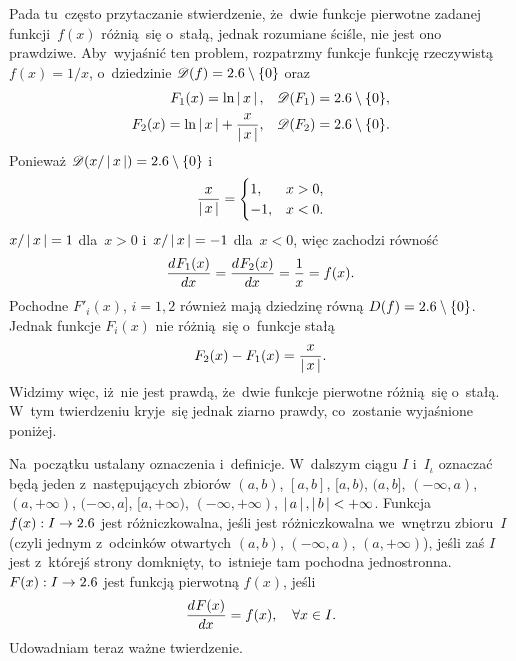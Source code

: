 \documentclass[a4paper,11pt]{article}
\begin{document}
\start {} Pada tu~często przytaczanie stwierdzenie, że~dwie
funkcje pierwotne zadanej funkcji~$f( x )$ różnią~się o~stałą, jednak
rozumiane ściśle, nie jest ono prawdziwe. Aby~wyjaśnić ten problem,
rozpatrzmy funkcje funkcję rzeczywistą $f( x ) = 1 / x$, o~dziedzinie
$\mathcal{D}( f ) = 2.6 \setminus \{  0  \}$ oraz
\begin{subequations}
  \begin{align}
    \label{eq:FichtenholzVolII-01a}
    F_{ 1 }( x )
    = \ln\left| \,  x  \, \right|, \quad &\mathcal{D}( F_{ 1 } ) = 2.6 \setminus \{  0  \}, \\
    \label{eq:FichtenholzVolII-01b}
    F_{ 2 }( x )
    = \ln\left| \,  x  \, \right| + \frac{ x }{ \left| \,  x  \, \right| },
    \quad &\mathcal{D}( F_{ 2 } ) = 2.6 \setminus \{  0  \}.
  \end{align}
\end{subequations}
Ponieważ $\mathcal{D}( x / \left| \,  x  \, \right| ) = 2.6 \setminus \{  0  \}$ i
\begin{equation}
  \label{eq:FichtenholzVolII-02}
  \frac{ x }{ \left| \,  x  \, \right| }
  =
  \begin{cases}
    1, &x > 0, \\
    -1, &x < 0.
  \end{cases}
\end{equation}
$x / \left| \,  x  \, \right| = 1$ dla~$x > 0$ i~$x / \left| \,  x  \, \right| = -1$ dla~$x < 0$,
więc zachodzi równość
\begin{equation}
  \label{eq:FichtenholzVolII-03}
  \frac{ d^{   } {  F_{ 1 }( x )  } }{ d {  x  }^{   } } = \frac{ d^{   } {  F_{ 2 }( x )  } }{ d {  x  }^{   } }
  = \frac{ 1 }{ x } = f( x ).
\end{equation}
Pochodne $F'_{ i }( x )$, $i = 1, 2$ również mają dziedzinę równą
$D( f ) = 2.6 \setminus \{  0  \}$. Jednak funkcje $F_{ i }( x )$ nie
różnią~się o~funkcje stałą
\begin{equation}
  \label{eq:FichtenholzVolII-04}
  F_{ 2 }( x ) - F_{ 1 }( x ) = \frac{ x }{ \left| \,  x  \, \right| }.
\end{equation}
Widzimy więc, iż~nie jest prawdą, że~dwie funkcje pierwotne różnią~się
o~stałą. W~tym twierdzeniu kryje~się jednak ziarno prawdy, co~zostanie
wyjaśnione poniżej.

Na~początku ustalany oznaczenia i~definicje. W~dalszym ciągu $I$
i~$I_{ \iota }$ oznaczać będą jeden z~następujących zbiorów
$( a, b )$, $[ a, b ]$, $[ a, b )$, $( a, b ]$, $( -\infty, a )$,
$( a, +\infty )$, $( -\infty, a ]$, $[ a, +\infty )$,
$( -\infty, +\infty )$, $\left| \,  a  \, \right|, \left| \,  b  \, \right| < +\infty$. Funkcja
$f( x ): I \to 2.6$ jest różniczkowalna, jeśli jest różniczkowalna
we~wnętrzu zbioru~$I$ (czyli jednym z~odcinków otwartych $( a, b )$,
$( -\infty, a )$, $( a, +\infty )$), jeśli zaś $I$ jest z~którejś
strony domknięty, to~istnieje tam pochodna jednostronna.
$F( x ): I \to 2.6$ jest funkcją pierwotną $f( x )$, jeśli
\begin{equation}
  \label{eq:FichtenholzVolII-05}
  \frac{ d^{   } {  F( x )  } }{ d {  x  }^{   } } = f( x ), \quad \forall x \in I.
\end{equation}
Udowadniam teraz ważne twierdzenie.
\end{document}

